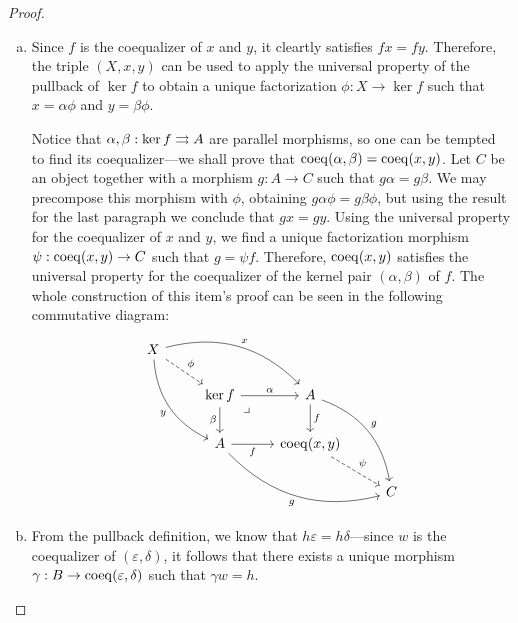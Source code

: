 \begin{proof}
    \begin{enumerate}[(a)]\setlength\itemsep{0em}
        \item Since \(f\) is the coequalizer of \(x\) and \(y\), it cleartly satisfies
              \(f x = f y\). Therefore, the triple \((X, x, y)\) can be used to apply the
              universal property of the pullback of \(\ker f\) to obtain a unique
              factorization \(\phi: X \to \ker f\) such that \(x = \alpha \phi\) and
              \(y = \beta \phi\).

              Notice that \(\alpha, \beta: \ker f \rightrightarrows A\) are parallel morphisms, so one
              can be tempted to find its coequalizer---we shall prove that
              \(\operatorname{coeq}(\alpha, \beta) = \operatorname{coeq}(x, y)\). Let \(C\) be an object together with a
              morphism \(g: A \to C\) such that \(g \alpha = g \beta\). We may precompose
              this morphism with \(\phi\), obtaining \(g \alpha \phi = g \beta \phi\), but
              using the result for the last paragraph we conclude that \(g x = g y\). Using
              the universal property for the coequalizer of \(x\) and \(y\), we find a
              unique factorization morphism \(\psi: \operatorname{coeq}(x, y) \to C\) such that
              \(g = \psi f\). Therefore, \(\operatorname{coeq}(x, y)\) satisfies the universal property
              for the coequalizer of the kernel pair \((\alpha, \beta)\) of \(f\). The whole
              construction of this item's proof can be seen in the following commutative
              diagram:
              \[
                  \begin{tikzcd}
                      X \ar[rd, dashed, "\phi"]
                      \ar[rrd, bend left, "x"]
                      \ar[drd, bend right, "y"'] & & &
                      \\
                      &\ker f \ar[r, "\alpha"]
                      \ar[rd, phantom, "\lrcorner", very near start]
                      \ar[d, "\beta"']
                      &A \ar[d, "f"] \ar[drd, bend left, "g"]
                      &
                      \\
                      &A \ar[r, "f"'] \ar[rrd, "g"', bend right]
                      &\Coeq(x, y) \ar[rd, dashed, "\psi"]
                      &
                      \\
                      & & &C
                  \end{tikzcd}
              \]

        \item From the pullback definition, we know that
              \(h \varepsilon = h \delta\)---since \(w\) is the coequalizer of
              \((\varepsilon, \delta)\), it follows that there exists a unique morphism
              \(\gamma: B \to \operatorname{coeq}(\varepsilon, \delta)\) such that \(\gamma w = h\).


\end{enumerate}
\end{proof}
